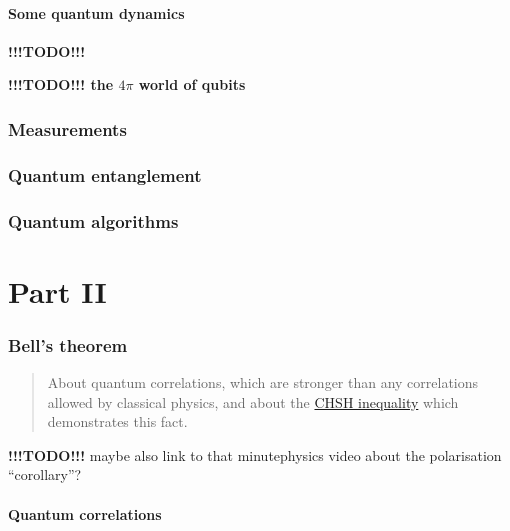 \documentclass{article}
\begin{document}
\hypertarget{some-quantum-dynamics}{%
\subsection{Some quantum dynamics}\label{some-quantum-dynamics}}

\textbf{!!!TODO!!!}

\textbf{!!!TODO!!! the \(4\pi\) world of qubits}

\hypertarget{chapter4}{%
\section{Measurements}\label{chapter4}}

\hypertarget{chapter5}{%
\section{Quantum entanglement}\label{chapter5}}

\hypertarget{chapter6}{%
\section{Quantum algorithms}\label{chapter6}}

\hypertarget{part-part-ii}{%
\part{Part II}\label{part-part-ii}}

\hypertarget{chapter7}{%
\section{Bell's theorem}\label{chapter7}}

\begin{quote}
About quantum correlations, which are stronger than any correlations allowed by classical physics, and about the \href{https://en.wikipedia.org/wiki/CHSH_inequality}{CHSH inequality} which demonstrates this fact.
\end{quote}

\textbf{!!!TODO!!!} maybe also link to that minutephysics video about the polarisation ``corollary''?

\hypertarget{quantum-correlations}{%
\subsection{Quantum correlations}\label{quantum-correlations}}
\end{document}
